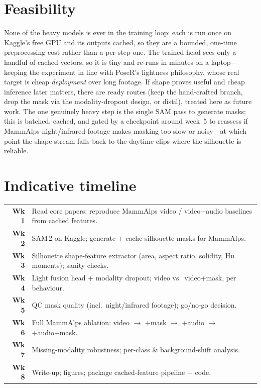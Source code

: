 \documentclass[11pt]{article}
\begin{document}
\section{Feasibility}
None of the heavy models is ever in the training loop: each is run once on Kaggle's free GPU and its outputs cached, so they are a bounded, one-time preprocessing cost rather than a per-step one. The trained head sees only a handful of cached vectors, so it is tiny and re-runs in minutes on a laptop---keeping the experiment in line with PoseR's lightness philosophy, whose real target is cheap \emph{deployment} over long footage. If shape proves useful and cheap inference later matters, there are ready routes (keep the hand-crafted branch, drop the mask via the modality-dropout design, or distil), treated here as future work. The one genuinely heavy step is the single SAM pass to generate masks; this is batched, cached, and gated by a checkpoint around week~5 to reassess if MammAlps night/infrared footage makes masking too slow or noisy---at which point the shape stream falls back to the daytime clips where the silhouette is reliable.

\section*{Indicative timeline}
\noindent
\begin{tabular}{@{}rl@{}}
\textbf{Wk 1} & Read core papers; reproduce MammAlps video / video+audio baselines from cached features.\\
\textbf{Wk 2} & SAM\,2 on Kaggle; generate + cache silhouette masks for MammAlps.\\
\textbf{Wk 3} & Silhouette shape-feature extractor (area, aspect ratio, solidity, Hu moments); sanity checks.\\
\textbf{Wk 4} & Light fusion head + modality dropout; video vs.\ video+mask, per behaviour.\\
\textbf{Wk 5} & QC mask quality (incl.\ night/infrared footage); go/no-go decision.\\
\textbf{Wk 6} & Full MammAlps ablation: video $\to$ +mask $\to$ +audio $\to$ +audio+mask.\\
\textbf{Wk 7} & Missing-modality robustness; per-class \& background-shift analysis.\\
\textbf{Wk 8} & Write-up; figures; package cached-feature pipeline + code.\\
\end{tabular}
\end{document}
